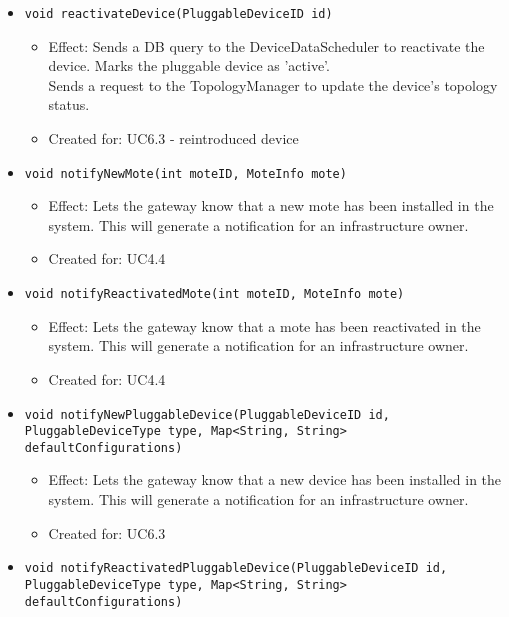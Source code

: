 \begin{itemize}
\begin{itemize}
                \item \texttt{void reactivateDevice(PluggableDeviceID id)}
                    \begin{itemize}
                        \item Effect: Sends a DB query to the DeviceDataScheduler to reactivate the device. Marks the pluggable device as 'active'. \\
                              Sends a request to the TopologyManager to update the device's topology status.
                        \item Created for: UC6.3 - reintroduced device
                    \end{itemize}
                \item \texttt{void notifyNewMote(int moteID, MoteInfo mote)}
                    \begin{itemize}
                        \item Effect: Lets the gateway know that a new mote has been installed in the system.
                              This will generate a notification for an infrastructure owner.
                        \item Created for: UC4.4
                    \end{itemize}
                \item \texttt{void notifyReactivatedMote(int moteID, MoteInfo mote)}
                    \begin{itemize}
                        \item Effect: Lets the gateway know that a mote has been reactivated in the system.
                              This will generate a notification for an infrastructure owner.
                        \item Created for: UC4.4
                    \end{itemize}
                \item \texttt{void notifyNewPluggableDevice(PluggableDeviceID id, PluggableDeviceType type, Map<String, String> defaultConfigurations)}
                    \begin{itemize}
                        \item Effect: Lets the gateway know that a new device has been installed in the system.
                              This will generate a notification for an infrastructure owner.
                        \item Created for: UC6.3
                    \end{itemize}
                \item \texttt{void notifyReactivatedPluggableDevice(PluggableDeviceID id, PluggableDeviceType type, Map<String, String> defaultConfigurations)}

\end{itemize}
\end{itemize}
